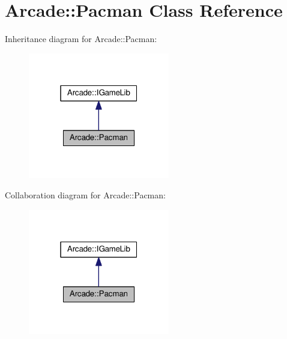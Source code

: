\hypertarget{class_arcade_1_1_pacman}{}\section{Arcade\+:\+:Pacman Class Reference}
\label{class_arcade_1_1_pacman}


Inheritance diagram for Arcade\+:\+:Pacman\+:
\nopagebreak
\begin{figure}[H]
\begin{center}
\leavevmode
\includegraphics[width=175pt]{class_arcade_1_1_pacman__inherit__graph}
\end{center}
\end{figure}


Collaboration diagram for Arcade\+:\+:Pacman\+:
\nopagebreak
\begin{figure}[H]
\begin{center}
\leavevmode
\includegraphics[width=175pt]{class_arcade_1_1_pacman__coll__graph}
\end{center}
\end{figure}
